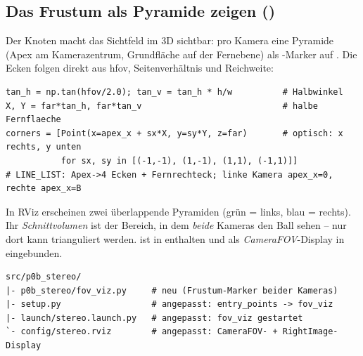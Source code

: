 \subsection{Das Frustum als Pyramide zeigen ()}
Der Knoten  macht das Sichtfeld im 3D sichtbar: pro Kamera eine
Pyramide (Apex am Kamerazentrum, Grundfläche auf der Fernebene) als
-Marker auf . Die Ecken folgen direkt
aus hfov, Seitenverhältnis und Reichweite:
\begin{lstlisting}[style=py,caption={\code{fov\_viz.py} (Kern der Frustum-Berechnung)}]
tan_h = np.tan(hfov/2.0); tan_v = tan_h * h/w          # Halbwinkel
X, Y = far*tan_h, far*tan_v                            # halbe Fernflaeche
corners = [Point(x=apex_x + sx*X, y=sy*Y, z=far)       # optisch: x rechts, y unten
           for sx, sy in [(-1,-1), (1,-1), (1,1), (-1,1)]]
# LINE_LIST: Apex->4 Ecken + Fernrechteck; linke Kamera apex_x=0, rechte apex_x=B
\end{lstlisting}
\noindent In RViz erscheinen zwei überlappende Pyramiden (grün = links, blau =
rechts). Ihr \emph{Schnittvolumen} ist der Bereich, in dem \emph{beide} Kameras
den Ball sehen -- nur dort kann trianguliert werden.  ist in
 enthalten und als \emph{CameraFOV}-Display in
 eingebunden.
\begin{lstlisting}[style=bash,caption={\code{ros2\_ws}-Delta (\# neu / \# angepasst)}]
src/p0b_stereo/
|- p0b_stereo/fov_viz.py     # neu (Frustum-Marker beider Kameras)
|- setup.py                  # angepasst: entry_points -> fov_viz
|- launch/stereo.launch.py   # angepasst: fov_viz gestartet
`- config/stereo.rviz        # angepasst: CameraFOV- + RightImage-Display
\end{lstlisting}

